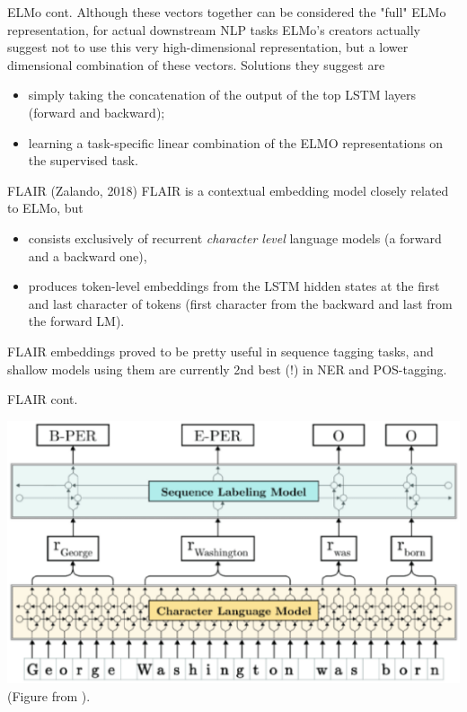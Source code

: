 \documentclass[style=upen, size=14pt]{powerdot}
\theoremstyle{definition}
\begin{document}
\begin{slide}[toc=]{ELMo cont.}
  Although these vectors together can be considered the "full" ELMo
  representation, for actual downstream NLP tasks ELMo's creators actually
  suggest not to use this very high-dimensional representation, but a lower
  dimensional combination of these vectors. Solutions they suggest are
  \begin{itemize}
  \item simply taking the concatenation of the output of the top LSTM layers (forward
    and backward);
  \item learning a task-specific linear combination of the ELMO representations on
    the supervised task.
  \end{itemize}
\end{slide}

\begin{slide}[toc=FLAIR]{FLAIR (Zalando, 2018)}
  FLAIR \citep{akbik2018contextual} is a contextual embedding model closely
  related to ELMo, but 
  \begin{itemize}
  \item consists exclusively of recurrent \emph{character level} language models
    (a forward and a backward one),
  \item produces token-level embeddings from the LSTM hidden states at the
    first and last character of tokens (first character from the backward and
    last from the forward LM).
  \end{itemize}
  FLAIR embeddings proved to be pretty useful in sequence tagging tasks, and
  shallow models using them are currently 2nd best (!) in NER and POS-tagging.
\end{slide}

\begin{slide}[toc=]{FLAIR cont.}
  \begin{center}
    \includegraphics[width=1\textwidth]{figures/flair.eps}
    \footnotesize{(Figure from \cite{akbik2018contextual}).}
  \end{center}
\end{slide}
\end{document}
